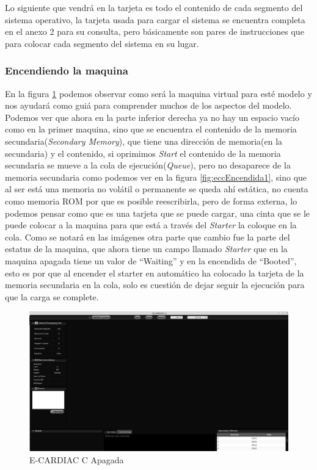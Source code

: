 \documentclass[letterpaper,12pt,oneside]{book}
\begin{document}
		Lo siguiente que vendrá en la tarjeta es todo el contenido de cada segmento del sistema operativo, la tarjeta usada para cargar el sistema
		se encuentra completa en el anexo 2 para su consulta, pero básicamente son pares de instrucciones que para colocar cada segmento
		del sistema en su lugar.
		
		\subsubsection{Encendiendo la maquina}
		
		En la figura \ref{fig:eccApagada} podemos observar  como será la maquina virtual para esté modelo y nos ayudará como guiá para comprender muchos
		de los aspectos del modelo. Podemos ver que ahora en la parte inferior derecha ya no hay un espacio vacío como en la primer maquina, sino que se encuentra
		el contenido de la memoria secundaria(\textit{Secondary Memory}), que tiene una dirección de memoria(en la secundaria) y el contenido, si oprimimos \textit{Start}
		el contenido de la memoria secundaria se mueve a la cola de ejecución(\textit{Queue}), pero no desaparece de la memoria secundaria como podemos
		ver en la figura \ref{fig:eccEncendida1}, sino que al ser está una memoria no volátil o 
		permanente se queda ahí estática, no cuenta como memoria ROM por que es posible
		reescribirla, pero de forma externa, lo podemos pensar como que es una tarjeta que se puede cargar, una cinta que se le puede colocar a la maquina para que
		está a través del \textit{Starter} la coloque en la cola. Como se notará en las imágenes otra parte que cambio fue la parte del estatus de
		la maquina, que ahora tiene un campo llamado \textit{Starter} que en la maquina apagada tiene un valor de ``Waiting'' y en la encendida de ``Booted'', esto
		es por que al encender el starter en automático ha colocado la tarjeta de la memoria secundaria en la cola, solo es cuestión de dejar seguir la ejecución
		para que la carga se complete.

		\begin{figure}[h]		
			\centering
			\includegraphics[scale=0.25]{media/CARDIACC/ECARDIACC_apagada.png}
			\caption{E-CARDIAC C Apagada}
			\label{fig:eccApagada}
		\end{figure}		
		
\end{document}
